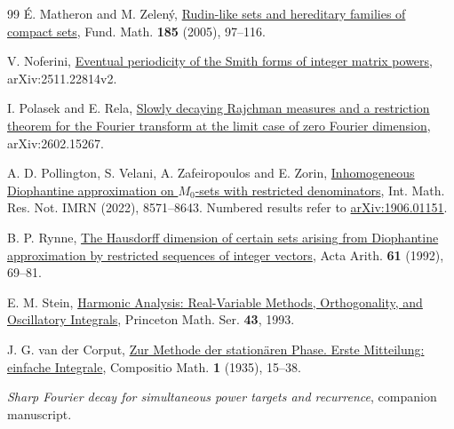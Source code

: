 \documentclass[11pt,a4paper,reqno]{amsart}
\theoremstyle{definition}
\theoremstyle{remark}
\numberwithin{equation}{section}
\begin{document}
\begin{thebibliography}{99}
 \'E. Matheron and M. Zelen\'y, \href{https://doi.org/10.4064/fm185-2-1}{Rudin-like sets and hereditary families of compact sets}, Fund. Math. \textbf{185} (2005), 97--116.

 V. Noferini, \href{https://arxiv.org/html/2511.22814v2}{Eventual periodicity of the Smith forms of integer matrix powers}, arXiv:2511.22814v2.

 I. Polasek and E. Rela, \href{https://arxiv.org/abs/2602.15267}{Slowly decaying Rajchman measures and a restriction theorem for the Fourier transform at the limit case of zero Fourier dimension}, arXiv:2602.15267.

 A. D. Pollington, S. Velani, A. Zafeiropoulos and E. Zorin, \href{https://doi.org/10.1093/imrn/rnaa307}{Inhomogeneous Diophantine approximation on \(M_0\)-sets with restricted denominators}, Int. Math. Res. Not. IMRN (2022), 8571--8643. Numbered results refer to \href{https://arxiv.org/abs/1906.01151}{arXiv:1906.01151}.

 B. P. Rynne, \href{https://matwbn.icm.edu.pl/ksiazki/aa/aa61/aa6115.pdf}{The Hausdorff dimension of certain sets arising from Diophantine approximation by restricted sequences of integer vectors}, Acta Arith. \textbf{61} (1992), 69--81.

 E. M. Stein, \href{https://doi.org/10.1515/9781400883929}{Harmonic Analysis: Real-Variable Methods, Orthogonality, and Oscillatory Integrals}, Princeton Math. Ser. \textbf{43}, 1993.

 J. G. van der Corput, \href{https://www.numdam.org/item/CM_1935__1__15_0/}{Zur Methode der station\"aren Phase. Erste Mitteilung: einfache Integrale}, Compositio Math. \textbf{1} (1935), 15--38.

 \emph{Sharp Fourier decay for simultaneous power targets and recurrence}, companion manuscript.
\end{thebibliography}
\end{document}

